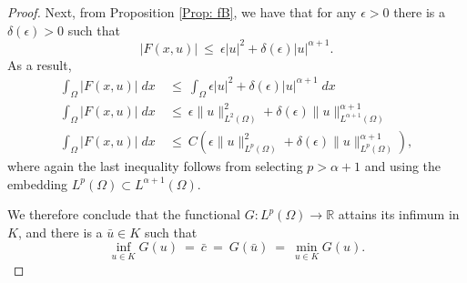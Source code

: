 \documentclass[11pt]{amsart}   	%
\theoremstyle{plain}
\numberwithin{equation}{section}
\def\ep{\epsilon}
\def\R{\mathbb{R}}
\begin{document}
\begin{proof}
{Next, from Proposition \ref{Prop: fB}, we have that for any $\ep >0$ there is a $\delta(\ep) >0$ such that 
\[ \left| F(x,u) \right| \ \leq \ \ep |u|^2 + \delta(\ep) |u|^{\alpha+1}.\]
As a result,
\begin{align*}
\int_\Omega \left| F(x,u) \right| \;dx & \ \leq \ \int_\Omega \ep |u|^2 + \delta(\ep) |u|^{\alpha+1} \;dx\\
\int_\Omega \left| F(x,u) \right| \;dx & \ \leq \ \ep \|u\|_{L^2(\Omega)}^2 + \delta(\ep)  \|u\|_{L^{\alpha+1}(\Omega)}^{\alpha+1} \\
\int_\Omega \left| F(x,u) \right| \;dx & \ \leq \ C( \ep \|u\|_{L^p(\Omega)}^2 + \delta(\ep)  \|u\|_{L^{p}(\Omega)}^{\alpha+1} ) ,
\end{align*}
where again the last inequality follows from selecting $p> \alpha +1$ and using the embedding $L^p(\Omega) \subset L^{\alpha+1}(\Omega)$.


We therefore conclude that the functional $G:L^p(\Omega) \longrightarrow \R$  attains its infimum in $K$, and there is a $\bar{u} \in K$ such that 
\[  \inf_{u \in K} G(u) \ = \ \bar{c} \ = \ G(\bar{u}) \ = \  \min_{u \in K } G(u).\] 
}










\end{proof}
\end{document}
